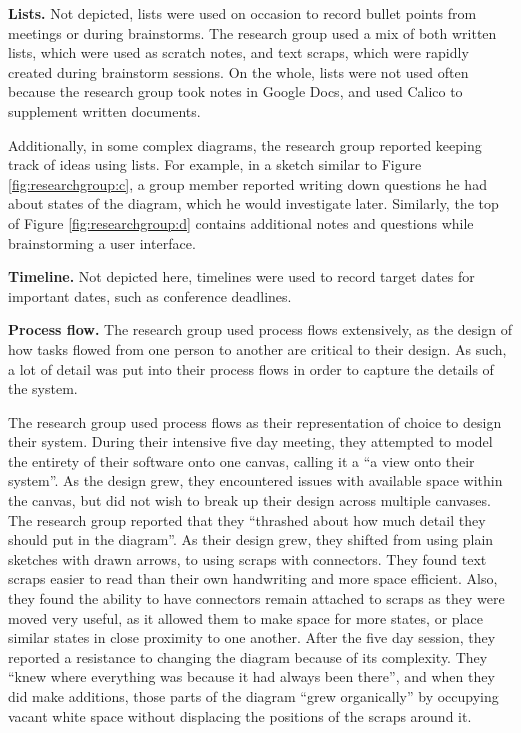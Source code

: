\documentclass[12pt,fleqn]{ucithesis}
\begin{document}
\textbf{Lists.}  Not depicted, lists were used on occasion to record bullet points from meetings or during brainstorms. The research group used a mix of both written lists, which were used as scratch notes, and text scraps, which were rapidly created during brainstorm sessions. On the whole, lists were not used often because the research group took notes in Google Docs, and used Calico to supplement written documents.

Additionally, in some complex diagrams, the research group reported keeping track of ideas using lists. For example, in a sketch similar to Figure \ref{fig:researchgroup:c}, a group member reported writing down questions he had about states of the diagram, which he would investigate later. Similarly, the top of Figure \ref{fig:researchgroup:d} contains additional notes and questions while brainstorming a user interface.


\textbf{Timeline.} Not depicted here, timelines were used to record target dates for important dates, such as conference deadlines.

\textbf{Process flow.} The research group used process flows extensively, as the design of how tasks flowed from one person to another are critical to their design. As such, a lot of detail was put into their process flows in order to capture the details of the system.

The research group used process flows as their representation of choice to design their system. During their intensive five day meeting, they attempted to model the entirety of their software onto one canvas, calling it a ``a view onto their system''. As the design grew, they encountered issues with available space within the canvas, but did not wish to break up their design across multiple canvases. The research group reported that they ``thrashed about how much detail they should put in the diagram''. As their design grew, they shifted from using plain sketches with drawn arrows, to using scraps with connectors. They found text scraps easier to read than their own handwriting and more space efficient. Also, they found the ability to have connectors remain attached to scraps as they were moved very useful, as it allowed them to make space for more states, or place similar states in close proximity to one another. After the five day session, they reported a resistance to changing the diagram because of its complexity. They ``knew where everything was because it had always been there'', and when they did make additions, those parts of the diagram ``grew organically'' by occupying vacant white space without displacing the positions of the scraps around it.
\end{document}

